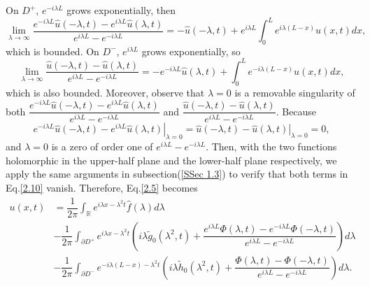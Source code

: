 \documentclass[12pt]{article}
\numberwithin{equation}{section}
\begin{document}
On $D^+$, $e^{-i\lambda L}$ grows exponentially, then 
\begin{equation}
    \lim\limits_{\lambda\to\infty} \dfrac{e^{-i\lambda L}\hat{u}(-\lambda,t) -e^{i\lambda L}\hat{u}(\lambda,t)}{e^{i\lambda L}-e^{-i\lambda L}}=-\hat{u}(-\lambda,t)+e^{i\lambda L}\int_{0}^{L} e^{i\lambda (L-x)}u(x,t)dx,
\end{equation}
which is bounded. On $D^-$, $e^{i\lambda L}$ grows exponentially, so 
\begin{equation}
    \lim\limits_{\lambda\to\infty} \dfrac{\hat{u}(-\lambda,t)-\hat{u}(\lambda,t)}{e^{i\lambda L}-e^{-i\lambda L}}=-e^{-i\lambda L}\hat{u}(\lambda,t)+\int_{0}^{L}e^{-i\lambda(L-x)}u(x,t)dx,
\end{equation}
which is also bounded. Moreover, observe that $\lambda=0$ is a removable singularity of both $\dfrac{e^{-i\lambda L}\hat{u}(-\lambda,t) -e^{i\lambda L}\hat{u}(\lambda,t)}{e^{i\lambda L}-e^{-i\lambda L}}$ and $\dfrac{\hat{u}(-\lambda,t)-\hat{u}(\lambda,t)}{e^{i\lambda L}-e^{-i\lambda L}}$. Because 
\begin{equation}
    \left.{e^{-i\lambda L}\hat{u}(-\lambda,t) -e^{i\lambda L}\hat{u}(\lambda,t)}\right\vert_{\lambda=0}=\left. \hat{u}(-\lambda,t)-\hat{u}(\lambda,t)\right\vert_{\lambda=0}=0,
\end{equation}
and $\lambda=0$ is a zero of order one of $e^{i\lambda L}-e^{-i\lambda L}$. Then, with the two functions holomorphic in the upper-half plane and the lower-half plane respectively, we apply the same arguments in subsection(\ref{SSec 1.3}) to verify that both terms in Eq.\eqref{2.10} vanish.
Therefore, Eq.\eqref{2.5} becomes 
\begin{equation}\label{2.14}
    \begin{split}
        u(x,t)&=\dfrac{1}{2\pi}\int_{\mathbb{R}} e^{i\lambda x-\lambda^2 t} \hat{f}(\lambda)d\lambda\\
        &-\dfrac{1}{2\pi}\int_{\partial D^+} e^{i\lambda x-\lambda^2t} \left(i\lambda\tilde{g}_0(\lambda^2,t)+\dfrac{e^{i\lambda L}\Phi(\lambda,t)-e^{-i\lambda L}\Phi(-\lambda,t)}{e^{i\lambda L}-e^{-i\lambda L}}\right)d\lambda\\
        &-\dfrac{1}{2\pi}\int_{\partial D^-} e^{-i\lambda(L-x)-\lambda^2 t}\left(i\lambda\tilde{h}_0(\lambda^2,t)+\dfrac{\Phi(\lambda,t)-\Phi(-\lambda,t)}{e^{i\lambda L}-e^{-i\lambda L}}\right)d\lambda.
    \end{split}
\end{equation}
\end{document}
